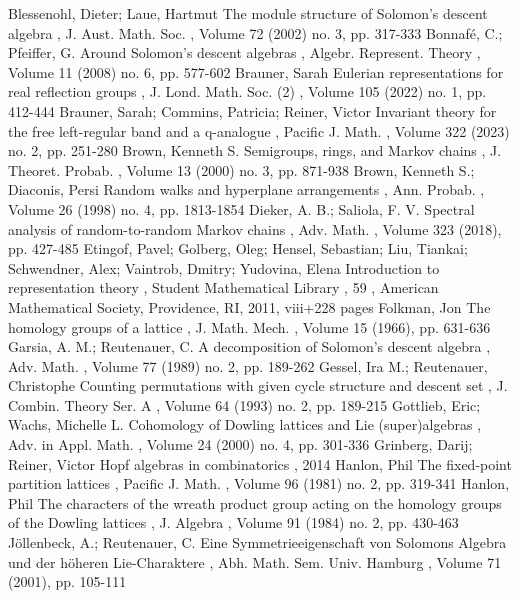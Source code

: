  Blessenohl, Dieter; Laue, Hartmut The module structure of Solomon’s descent algebra , J. Aust. Math. Soc. , Volume 72 (2002) no. 3, pp. 317-333
 Bonnafé, C.; Pfeiffer, G. Around Solomon’s descent algebras , Algebr. Represent. Theory , Volume 11 (2008) no. 6, pp. 577-602
 Brauner, Sarah Eulerian representations for real reflection groups , J. Lond. Math. Soc. (2) , Volume 105 (2022) no. 1, pp. 412-444
 Brauner, Sarah; Commins, Patricia; Reiner, Victor Invariant theory for the free left-regular band and a q-analogue , Pacific J. Math. , Volume 322 (2023) no. 2, pp. 251-280
 Brown, Kenneth S. Semigroups, rings, and Markov chains , J. Theoret. Probab. , Volume 13 (2000) no. 3, pp. 871-938
 Brown, Kenneth S.; Diaconis, Persi Random walks and hyperplane arrangements , Ann. Probab. , Volume 26 (1998) no. 4, pp. 1813-1854
 Dieker, A. B.; Saliola, F. V. Spectral analysis of random-to-random Markov chains , Adv. Math. , Volume 323 (2018), pp. 427-485
 Etingof, Pavel; Golberg, Oleg; Hensel, Sebastian; Liu, Tiankai; Schwendner, Alex; Vaintrob, Dmitry; Yudovina, Elena Introduction to representation theory , Student Mathematical Library , 59 , American Mathematical Society, Providence, RI, 2011, viii+228 pages
 Folkman, Jon The homology groups of a lattice , J. Math. Mech. , Volume 15 (1966), pp. 631-636
 Garsia, A. M.; Reutenauer, C. A decomposition of Solomon’s descent algebra , Adv. Math. , Volume 77 (1989) no. 2, pp. 189-262
 Gessel, Ira M.; Reutenauer, Christophe Counting permutations with given cycle structure and descent set , J. Combin. Theory Ser. A , Volume 64 (1993) no. 2, pp. 189-215
 Gottlieb, Eric; Wachs, Michelle L. Cohomology of Dowling lattices and Lie (super)algebras , Adv. in Appl. Math. , Volume 24 (2000) no. 4, pp. 301-336
 Grinberg, Darij; Reiner, Victor Hopf algebras in combinatorics , 2014
 Hanlon, Phil The fixed-point partition lattices , Pacific J. Math. , Volume 96 (1981) no. 2, pp. 319-341
 Hanlon, Phil The characters of the wreath product group acting on the homology groups of the Dowling lattices , J. Algebra , Volume 91 (1984) no. 2, pp. 430-463
 Jöllenbeck, A.; Reutenauer, C. Eine Symmetrieeigenschaft von Solomons Algebra und der höheren Lie-Charaktere , Abh. Math. Sem. Univ. Hamburg , Volume 71 (2001), pp. 105-111
